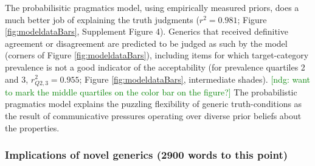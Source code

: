 \documentclass[10pt,letterpaper]{article}
\newcommand{\ndg}[1]{\textcolor{Green}{[ndg: #1]}}
\begin{document}

The probabilisitic pragmatics model, using empirically measured priors, does a much better job of explaining the truth judgments ($r^2=0.981$; Figure \ref{fig:modeldataBars}, Supplement Figure 4). 
Generics that received definitive agreement or disagreement are predicted to be judged as such by the model (corners of Figure \ref{fig:modeldataBars}), including items for which target-category prevalence is not a good indicator of the acceptability (for prevalence quartiles 2 and 3, $r_{Q2,3}^2=0.955$; Figure \ref{fig:modeldataBars}, intermediate shades). \ndg{want to mark the middle quartiles on the color bar on the figure?}
The probabilistic pragmatics model explains the puzzling flexibility of generic truth-conditions as the result of communicative pressures operating over diverse prior beliefs about the properties. 

\subsubsection*{Implications of novel generics (2900 words to this point)} 
\end{document}
